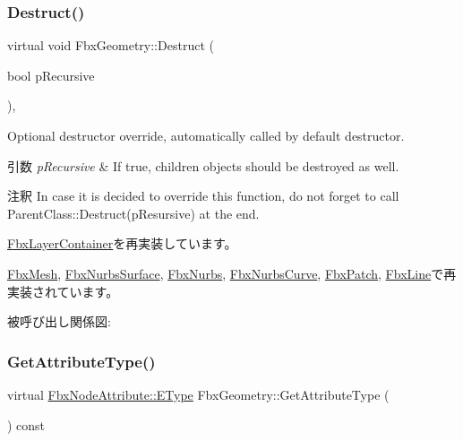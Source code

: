 \mbox{\label{class_fbx_geometry_a07e94f7801067d66429afbf1799795cd}} 
\subsubsection{\texorpdfstring{Destruct()}{Destruct()}}
{\footnotesize\ttfamily virtual void Fbx\+Geometry\+::\+Destruct (\begin{DoxyParamCaption}\item[{bool}]{p\+Recursive }\end{DoxyParamCaption})\hspace{0.3cm}{\ttfamily [protected]}, {\ttfamily [virtual]}}

Optional destructor override, automatically called by default destructor. 
\begin{DoxyParams}{引数}
{\em p\+Recursive} & If true, children objects should be destroyed as well. \\
\hline
\end{DoxyParams}
\begin{DoxyRemark}{注釈}
In case it is decided to override this function, do not forget to call Parent\+Class\+::\+Destruct(p\+Resursive) at the end. 
\end{DoxyRemark}


\hyperlink{class_fbx_layer_container_aefb90aadf569c7ebbbd3672e9c45776f}{Fbx\+Layer\+Container}を再実装しています。



\hyperlink{class_fbx_mesh_a1755e89d515fadbc2d52924917b618f7}{Fbx\+Mesh}, \hyperlink{class_fbx_nurbs_surface_ab9ff252170ad2dc35958af782962a5c9}{Fbx\+Nurbs\+Surface}, \hyperlink{class_fbx_nurbs_a8a5ea388bc948e47ab65e1705f98f402}{Fbx\+Nurbs}, \hyperlink{class_fbx_nurbs_curve_a8c562cccf434c37cb3aad0df27d60e86}{Fbx\+Nurbs\+Curve}, \hyperlink{class_fbx_patch_a7e094310626891214577dabe4ff145f9}{Fbx\+Patch}, \hyperlink{class_fbx_line_a92abd64f6b58057c899bf5733a2e2275}{Fbx\+Line}で再実装されています。

被呼び出し関係図\+:
\mbox{\label{class_fbx_geometry_a41ae23e5d0cf08693bca49737f333de9}} 
\subsubsection{\texorpdfstring{Get\+Attribute\+Type()}{GetAttributeType()}}
{\footnotesize\ttfamily virtual \hyperlink{class_fbx_node_attribute_a08e1669d3d1a696910756ab17de56d6a}{Fbx\+Node\+Attribute\+::\+E\+Type} Fbx\+Geometry\+::\+Get\+Attribute\+Type (\begin{DoxyParamCaption}{ }\end{DoxyParamCaption}) const\hspace{0.3cm}{\ttfamily [virtual]}}

